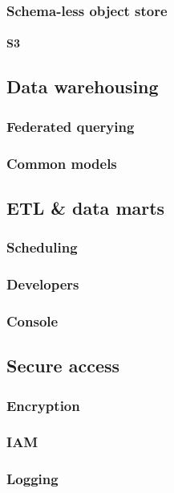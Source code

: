 \documentclass[10pt]{article}
\begin{document}
\subsubsection{Schema-less object store}
\paragraph{S3}

\subsection{Data warehousing}
\subsubsection{Federated querying}
\subsubsection{Common models}

\subsection{ETL \& data marts}
\subsubsection{Scheduling}
\subsubsection{Developers}
\subsubsection{Console}

\subsection{Secure access}
\subsubsection{Encryption}
\subsubsection{IAM}
\subsubsection{Logging}
\end{document}
